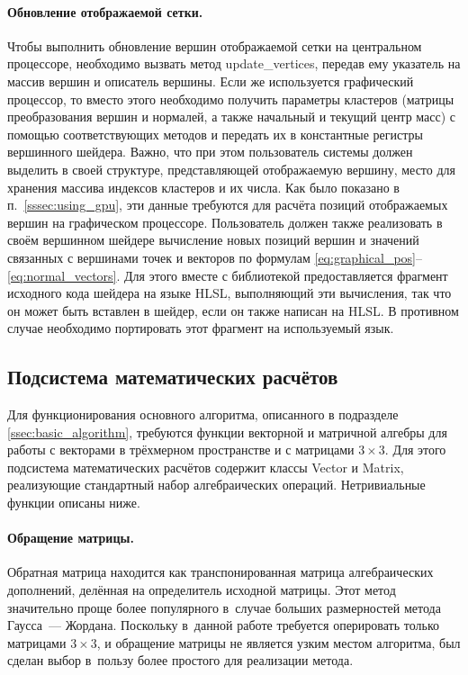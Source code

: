 \documentclass[a4paper, 14pt, titlepage]{extarticle}
\begin{document}
        \paragraph{Обновление отображаемой сетки.}
        Чтобы выполнить обновление вершин отображаемой сетки на центральном процессоре, необходимо вызвать метод
        update\_vertices, передав ему указатель на массив вершин и описатель вершины.
        Если же используется графический процессор, то вместо этого необходимо
        получить параметры кластеров (матрицы преобразования вершин и нормалей, а также начальный и
        текущий центр масс) с помощью соответствующих методов и передать их в константные регистры
        вершинного шейдера. Важно, что при этом пользователь системы должен выделить в своей структуре,
        представляющей отображаемую вершину, место для хранения массива индексов кластеров и их
        числа. Как было показано в п.~\ref{sssec:using_gpu}, эти данные требуются для расчёта
        позиций отображаемых вершин на графическом процессоре. Пользователь должен также реализовать
        в своём вершинном шейдере вычисление новых позиций вершин и значений связанных с вершинами
        точек и векторов по формулам \eqref{eq:graphical_pos}--\eqref{eq:normal_vectors}.
        Для этого вместе с библиотекой предоставляется фрагмент исходного кода шейдера на языке HLSL,
        выполняющий эти вычисления, так что он может быть вставлен в шейдер, если он также написан
        на HLSL. В противном случае необходимо портировать этот фрагмент на используемый язык.

    \subsection{Подсистема математических расчётов}\label{sssec:math}

        Для функционирования основного алгоритма, описанного в подразделе \ref{ssec:basic_algorithm}, требуются
        функции векторной и матричной алгебры для работы с векторами в трёхмерном пространстве и с
        матрицами $3 \times 3$. Для этого подсистема математических расчётов содержит
        классы Vector и Matrix, реализующие стандартный набор алгебраических операций. Нетривиальные
        функции описаны ниже.

        \paragraph{Обращение матрицы.}
        Обратная матрица находится как транспонированная матрица алгебраических дополнений, делённая
        на определитель исходной матрицы. Этот метод значительно проще более популярного в~случае
        больших размерностей метода Гаусса~--- Жордана. Поскольку в~данной работе требуется
        оперировать только матрицами $3 \times 3$, и обращение матрицы не является узким местом
        алгоритма, был сделан выбор в~пользу более простого для реализации метода.
\end{document}
